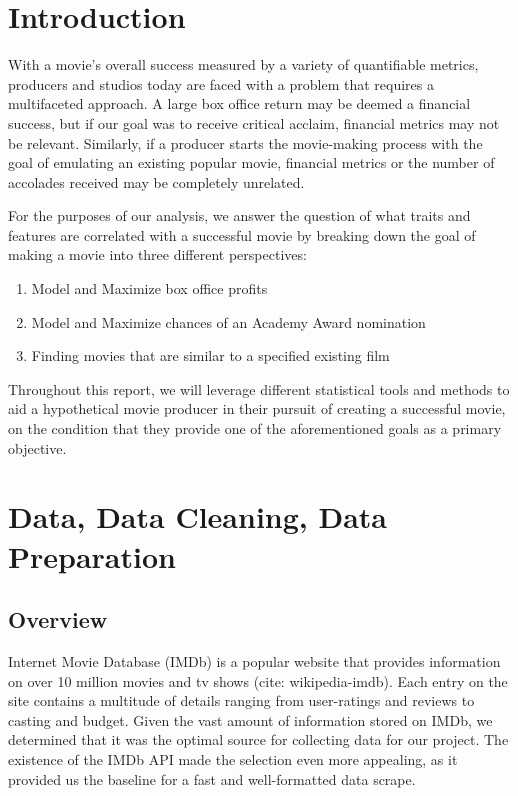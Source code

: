 \documentclass[10pt]{article}
\begin{document}
\section{Introduction}

With a movie’s overall success measured by a variety of quantifiable metrics, producers and studios today are faced with a problem that requires a multifaceted approach. A large box office return may be deemed a financial success, but if our goal was to receive critical acclaim, financial metrics may not be relevant. Similarly, if a producer starts the movie-making process with the goal of emulating an existing popular movie, financial metrics or the number of accolades received may be completely unrelated.

For the purposes of our analysis, we answer the question of what traits and features are correlated with a successful movie by breaking down the goal of making a movie into three different perspectives:

\begin{enumerate}
\item Model and Maximize box office profits
\item Model and Maximize chances of an Academy Award nomination
\item Finding movies that are similar to a specified existing film
\end{enumerate}

Throughout this report, we will leverage different statistical tools and methods to aid a hypothetical movie producer in their pursuit of creating a successful movie, on the condition that they provide one of the aforementioned goals as a primary objective.


\section{Data, Data Cleaning, Data Preparation}

\subsection{Overview}

Internet Movie Database (IMDb) is a popular website that provides information on over 10 million movies and tv shows (cite: wikipedia-imdb). Each entry on the site contains a multitude of details ranging from user-ratings and reviews to casting and budget. Given the vast amount of information stored on IMDb, we determined that it was the optimal source for collecting data for our project. The existence of the IMDb API made the selection even more appealing, as it provided us the baseline for a fast and well-formatted data scrape.
\end{document}
